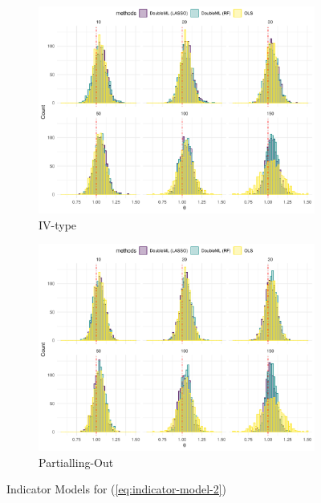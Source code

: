 \documentclass[en,12pt,mtpro2]{elegantpaper}
\begin{document}
\begin{figure}[htp]
    \centering
    \begin{subfigure}{.41\textwidth}
        \centering
        \includegraphics[width=\linewidth]{figures/simulation-indicator6 (IV-type).pdf}
        \caption{IV-type}
    \end{subfigure}
    \begin{subfigure}{.41\textwidth}
        \centering
        \includegraphics[width=\linewidth]{figures/simulation-indicator6 (partialling out).pdf}
        \caption{Partialling-Out}
    \end{subfigure}
    \caption{Indicator Models for (\ref{eq:indicator-model-2})}
\end{figure}
\clearpage
\end{document}

